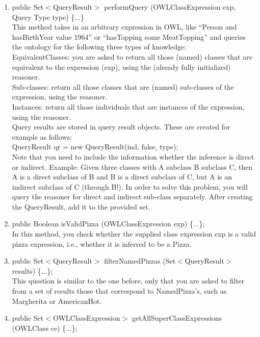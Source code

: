 \documentclass{article}
\begin{document}
    \begin{enumerate}
    \item {\textsf{public Set$<$QueryResult$>$ performQuery (OWLClassExpression exp, Query Type type) \{...\}}}\\
    This method takes in an arbitrary expression in OWL, like ``Person and hasBirthYear value 1964'' or ``hasTopping some MeatTopping'' and queries the ontology for the following three types of knowledge:\\
    EquivalentClasses: you are asked to return all those (named) classes that are equivalent to the expression (exp), using the (already fully initialized) reasoner.\\
    Sub-classes: return all those classes that are (named) sub-classes of the expression, using the reasoner.\\
    Instances: return all those individuals that are instances of the expression, using the reasoner.\\
    Query results are stored in query result objects. These are created for example as follows:\\
    {\textsf{QueryResult qr = new QueryResult(ind, false, type);}}\\
    Note that you need to include the information whether the inference is direct or indirect. Example: Given three classes with A subclass B subclass C, then A is a direct subclass of B and B is a direct subclass of C, but A is an indirect subclass of C (through B!). In order to solve this problem, you will query the reasoner for direct and indirect sub-class separately. After creating the QueryResult, add it to the provided set.
    \item {\textsf{public Boolean isValidPizza (OWLClassExpression exp) \{...\};}}\\
    In this method, you check whether the supplied class expression exp is a valid pizza expression, i.e., whether it is inferred to be a Pizza.
    \item {\textsf{public Set$<$QueryResult$>$ filterNamedPizzas (Set$<$QueryResult$>$ results) \{...\};}}\\
    This question is similar to the one before, only that you are asked to filter from a set of results those that correspond to NamedPizza's, such as Margherita or AmericanHot.
    \item {\textsf{public Set$<$OWLClassExpression$>$ getAllSuperClassExpressions (OWLClass ce) \{...\};}}\\
    \end{enumerate}
\end{document}
